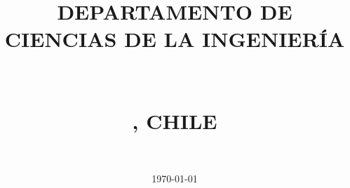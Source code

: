 \title{
	\vspace{2cm}\huge{\MakeUppercase{\textbf{\TITULO}}}\\
	\upshape \large{\textit{\MakeUppercase{\subtitulo}}}\\ \vspace{1cm}
	\Large \MakeUppercase{Departamento de Ciencias de La Ingeniería}\\
	\Large \MakeUppercase{\carrera}\\
	\Large \MakeUppercase{\asignatura}\\
	\large \MakeUppercase{\campus, Chile}
}
\author{
	\href{mailto:\correoa}{\autora}\\
    \href{mailto:\correob}{\autorb}
}
\date{\vspace{3cm}\today}

\makeatletter
\let\oldmaketitle\maketitle
\renewcommand{\maketitle}{%
	\thispagestyle{empty}%
	\AddToShipoutPicture*{\BackgroundPic}%
	{\color{white}\oldmaketitle}%
	\ClearShipoutPicture%
}
\makeatother

